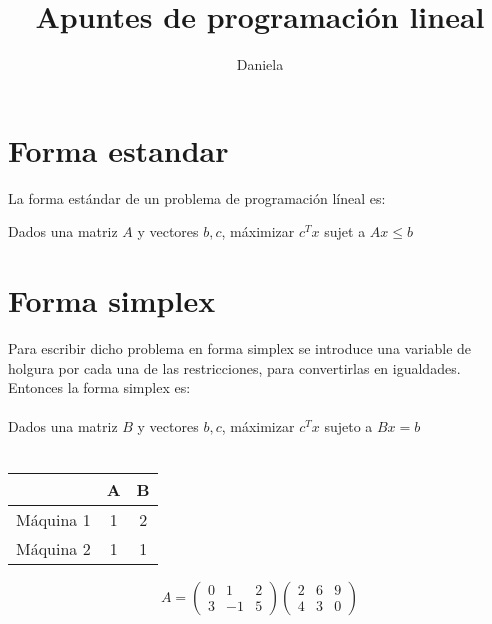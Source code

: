 \documentclass{article}
\title{Apuntes de programación lineal}
\author{Daniela}
\begin{document}
\maketitle
\tableofcontents
\section{Forma estandar}
\label{sec:forma-estandar}


La forma estándar de un problema de programación líneal es:


Dados una matriz $A$ y vectores $b,c$, máximizar $c^Tx$ sujet a $Ax\leq b$


\section{Forma simplex}
\label{sec:forma-simplex}


Para escribir dicho problema en forma simplex se introduce una variable de holgura por cada una de las restricciones, para convertirlas en igualdades.
Entonces la forma simplex es:\\\\Dados una matriz $B$ y vectores $b,c$, máximizar $c^Tx$ sujeto a $Bx=b$ \\\\


\begin{tabular}{|c|c|c|}
  \hline
  & A & B \\
  \hline
  Máquina 1 & 1 & 2 \\
  \hline
  Máquina 2 & 1 & 1 \\
  \hline
    
\end{tabular}
\bigskip

\begin{equation}
  \label{eq:1}
  A=
  \begin{pmatrix}
    0 & 1 & 2 \\
    3 & -1 & 5
  \end{pmatrix}
  \begin{pmatrix}
    2 & 6 & 9\\
    4 & 3 & 0
   \end{pmatrix}
 \end{equation}
\end{document}

